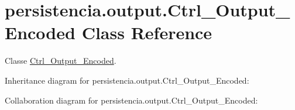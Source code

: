 \hypertarget{classpersistencia_1_1output_1_1Ctrl__Output__Encoded}{}\section{persistencia.\+output.\+Ctrl\+\_\+\+Output\+\_\+\+Encoded Class Reference}
\label{classpersistencia_1_1output_1_1Ctrl__Output__Encoded}


Classe \hyperlink{classpersistencia_1_1output_1_1Ctrl__Output__Encoded}{Ctrl\+\_\+\+Output\+\_\+\+Encoded}.  




Inheritance diagram for persistencia.\+output.\+Ctrl\+\_\+\+Output\+\_\+\+Encoded\+:


Collaboration diagram for persistencia.\+output.\+Ctrl\+\_\+\+Output\+\_\+\+Encoded\+:
